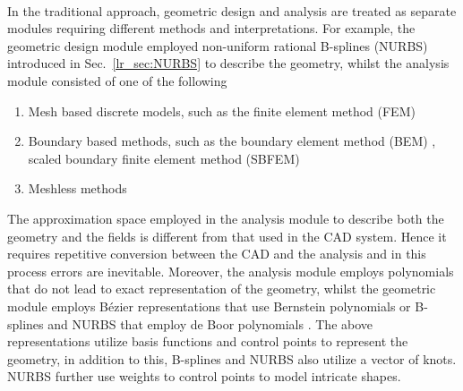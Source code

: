\paragraph{}
In the traditional approach, geometric design and analysis are treated as separate modules requiring different methods and interpretations.
For example, the geometric design module employed non-uniform rational B-splines (NURBS) introduced in Sec.~\ref{lr_sec:NURBS} to describe the geometry, whilst the analysis module consisted of one of the following
\begin{enumerate}
    \item Mesh based discrete models, such as the finite element method (FEM) \citep{doi:10.1111/j.1467-8667.1989.tb00025.x}
    \item Boundary based methods, such as the boundary element method (BEM) \citep{book}, scaled boundary finite element method (SBFEM) \citep{Son1997}
    \item Meshless methods \citep{article123213eds}
\end{enumerate}
The approximation space employed in the analysis module to describe both the geometry and the fields is different from that used in the CAD system.
Hence it requires repetitive conversion between the CAD and the analysis and in this process errors are inevitable.
Moreover, the analysis module employs polynomials that do not lead to exact representation of the geometry, whilst the geometric module employs Bézier representations that use Bernstein polynomials or B-splines and NURBS that employ de Boor polynomials \citep{Pie1997}.
The above representations utilize basis functions and control points to represent the geometry, in addition to this, B-splines and NURBS also utilize a vector
of knots.
NURBS further use weights to control points to model intricate shapes.

